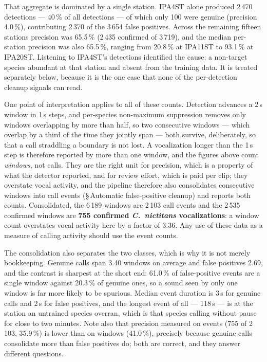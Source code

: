 \documentclass[final,3p,times]{elsarticle}
\begin{document}
That aggregate is dominated by a single station. IPA4ST alone produced 2\,470
detections --- 40\,\% of all detections --- of which only 100 were genuine
(precision 4.0\,\%), contributing 2\,370 of the 3\,654 false positives. Across
the remaining fifteen stations precision was 65.5\,\% (2\,435 confirmed of
3\,719), and the median per-station precision was also 65.5\,\%, ranging from
20.8\,\% at IPA11ST to 93.1\,\% at IPA20ST. Listening to IPA4ST's detections
identified the cause: a non-target species abundant at that station and absent
from the training data. It is treated separately below, because it is the one
case that none of the per-detection cleanup signals can read.

One point of interpretation applies to all of these counts. Detection advances a
2\,s window in 1\,s steps, and per-species non-maximum suppression removes only
windows overlapping by more than half, so two consecutive windows --- which
overlap by a third of the time they jointly span --- both survive, deliberately,
so that a call straddling a boundary is not lost. A vocalization longer than the
1\,s step is therefore reported by more than one window, and the figures above
count \emph{windows}, not calls. They are the right unit for precision, which is
a property of what the detector reported, and for review effort, which is paid
per clip; they overstate vocal activity, and the pipeline therefore also
consolidates consecutive windows into call events
(\S\,Automatic false-positive cleanup) and reports both counts. Consolidated,
the 6\,189 windows are 2\,103 call events and the 2\,535 confirmed windows are
\textbf{755 confirmed \textit{C.\ nictitans} vocalizations}: a window count
overstates vocal activity here by a factor of 3.36. Any use of these data as a
measure of calling activity should use the event counts.

The consolidation also separates the two classes, which is why it is not merely
bookkeeping. Genuine calls span 3.40 windows on average and false positives
2.69, and the contrast is sharpest at the short end: 61.0\,\% of false-positive
events are a single window against 20.3\,\% of genuine ones, so a sound seen by
only one window is far more likely to be spurious. Median event duration is 3\,s
for genuine calls and 2\,s for false positives, and the longest event of all ---
118\,s --- is at the station an untrained species overran, which is that
species calling without pause for close to two minutes. Note also that precision
measured on events (755 of 2\,103, 35.9\,\%) is lower than on windows
(41.0\,\%), precisely because genuine calls consolidate more than false
positives do; both are correct, and they answer different questions.
\end{document}
